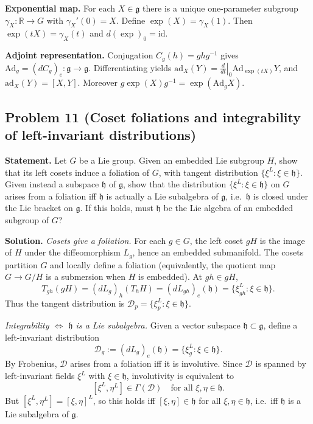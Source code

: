\documentclass[12pt,a4paper]{article}
\theoremstyle{plain}
\theoremstyle{definition}      %
\begin{document}
\textbf{Exponential map.}
For each $X\in\mathfrak g$ there is a unique one-parameter subgroup $\gamma_X:\mathbb R\to G$
with $\gamma_X'(0)=X$. Define $\exp(X)=\gamma_X(1)$.
Then $\exp(tX)=\gamma_X(t)$ and $d(\exp)_0=\mathrm{id}$.

\textbf{Adjoint representation.}
Conjugation $C_g(h)=ghg^{-1}$ gives $\mathrm{Ad}_g=(dC_g)_e:\mathfrak g\to\mathfrak g$.
Differentiating yields $\mathrm{ad}_X(Y)=\left.\frac{d}{dt}\right|_0\mathrm{Ad}_{\exp(tX)}Y$,
and $\mathrm{ad}_X(Y)=[X,Y]$.
Moreover $g\exp(X)g^{-1}=\exp(\mathrm{Ad}_g X)$.

\subsection*{Problem 11 (Coset foliations and integrability of left-invariant distributions)}
\textbf{Statement.}
Let $G$ be a Lie group. Given an embedded Lie subgroup $H$, show that its left cosets induce a foliation of $G$,
with tangent distribution $\{\xi^L:\xi\in\mathfrak h\}$.
Given instead a subspace $\mathfrak h$ of $\mathfrak g$, show that the distribution $\{\xi^L:\xi\in\mathfrak h\}$
on $G$ arises from a foliation iff $\mathfrak h$ is actually a Lie subalgebra of $\mathfrak g$, i.e.\ $\mathfrak h$
is closed under the Lie bracket on $\mathfrak g$.
If this holds, must $\mathfrak h$ be the Lie algebra of an embedded subgroup of $G$?

\textbf{Solution.}
\emph{Cosets give a foliation.}
For each $g\in G$, the left coset $gH$ is the image of $H$ under the diffeomorphism $L_g$, hence an embedded submanifold.
The cosets partition $G$ and locally define a foliation (equivalently, the quotient map $G\to G/H$ is a submersion when $H$
is embedded). At $gh\in gH$,
\[
T_{gh}(gH)=(dL_g)_h(T_hH)=(dL_{gh})_e(\mathfrak h)=\{\xi^L_{gh}:\xi\in\mathfrak h\}.
\]
Thus the tangent distribution is $\mathcal D_p=\{\xi^L_p:\xi\in\mathfrak h\}$.

\emph{Integrability $\Longleftrightarrow$ $\mathfrak h$ is a Lie subalgebra.}
Given a vector subspace $\mathfrak h\subset\mathfrak g$, define a left-invariant distribution
\[
\mathcal D_g:=(dL_g)_e(\mathfrak h)=\{\xi^L_g:\xi\in\mathfrak h\}.
\]
By Frobenius, $\mathcal D$ arises from a foliation iff it is involutive.
Since $\mathcal D$ is spanned by left-invariant fields $\xi^L$ with $\xi\in\mathfrak h$, involutivity is equivalent to
\[
[\xi^L,\eta^L]\in\Gamma(\mathcal D)\quad\text{for all }\xi,\eta\in\mathfrak h.
\]
But $[\xi^L,\eta^L]=[\xi,\eta]^L$, so this holds iff $[\xi,\eta]\in\mathfrak h$ for all $\xi,\eta\in\mathfrak h$,
i.e.\ iff $\mathfrak h$ is a Lie subalgebra of $\mathfrak g$.
\end{document}
